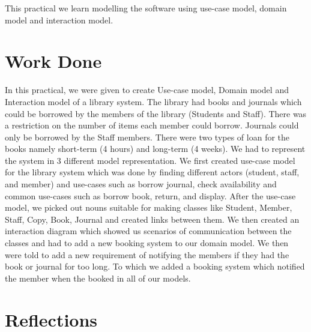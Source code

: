 This practical we learn modelling the software using use-case model, domain model and interaction model.

\section{Work Done}

In this practical, we were given to create Use-case model, Domain model and Interaction model of a library system. The library had books and journals which could be borrowed by the members of the library (Students and Staff). There was a restriction on the number of items each member could borrow. Journals could only be borrowed by the Staff members. There were two types of loan for the books namely short-term (4 hours) and long-term (4 weeks). We had to represent the system in 3 different model representation. We first created use-case model for the library system which was done by finding different actors (student, staff, and member) and use-cases such as borrow journal, check availability and common use-cases such as borrow book, return, and display. After the use-case model, we picked out nouns suitable for making classes like Student, Member, Staff, Copy, Book, Journal and created links between them. We then created an interaction diagram which showed us scenarios of communication between the classes and had to add a new booking system to our domain model. We then were told to add a new requirement of notifying the members if they had the book or journal for too long. To which we added a booking system which notified the member when the booked in all of our models.

\section{Reflections}

